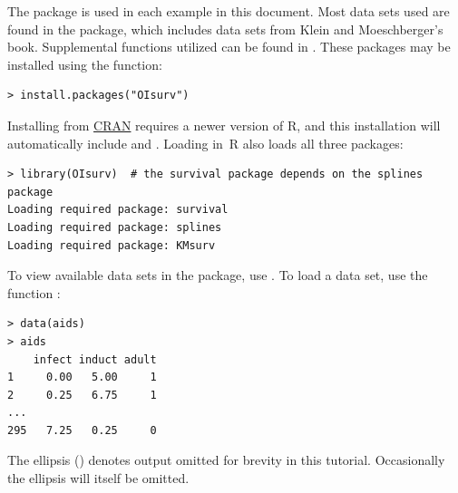 \documentclass[11pt]{article}
\newcommand{\R}[1]{\textsf{R}}
\begin{document}
The  package is used in each example in this document. Most data sets used are found in the  package, which includes data sets from Klein and Moeschberger's book. Supplemental functions utilized can be found in . These packages may be installed using the  function:
{\color{verbatimrcom}\begin{verbatim}
> install.packages("OIsurv")
\end{verbatim}}
Installing  from \href{http://cran.r-project.org}{CRAN} requires a newer version of \R{}, and this installation will automatically include  and . Loading  in~\R{} also loads all three packages:
{\color{verbatimrcom}\begin{verbatim}
> library(OIsurv)  # the survival package depends on the splines package
Loading required package: survival
Loading required package: splines
Loading required package: KMsurv
\end{verbatim}}
To view available data sets in the  package, use . To load a data set, use the function :
{\color{verbatimrcom}\begin{verbatim}
> data(aids)
> aids
    infect induct adult
1     0.00   5.00     1
2     0.25   6.75     1
...
295   7.25   0.25     0
\end{verbatim}}
The ellipsis () denotes output omitted for brevity in this tutorial. Occasionally the ellipsis will itself be omitted.
\end{document}
